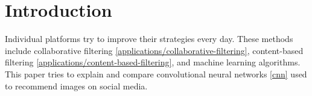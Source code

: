 \section{Introduction} \label{introduction}

Individual platforms try to improve their strategies every day. These methods include collaborative filtering \ref{applications/collaborative-filtering}, content-based filtering \ref{applications/content-based-filtering}, and machine learning algorithms.\cite{10142790} This paper tries to explain and compare convolutional neural networks \ref{cnn} used to recommend images on social media.